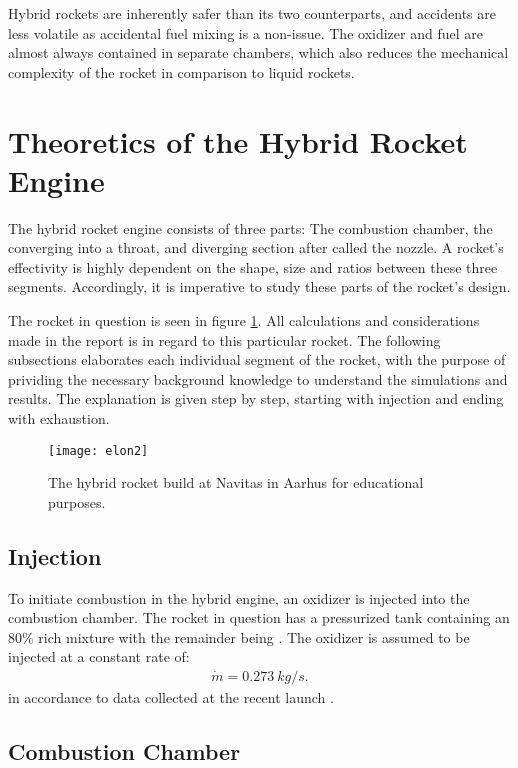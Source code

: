   Hybrid rockets are inherently safer than its two counterparts, and accidents are less volatile as accidental fuel mixing is a non-issue. The oxidizer and fuel are almost always contained in separate chambers, which also reduces the mechanical complexity of the rocket in comparison to liquid rockets.

\section{Theoretics of the Hybrid Rocket Engine}

  The hybrid rocket engine consists of three parts: The combustion chamber, the converging into a throat, and diverging section after called the nozzle. A rocket's effectivity is highly dependent on the shape, size and ratios between these three segments. Accordingly, it is imperative to study these parts of the rocket's design.
  
  The rocket in question is seen in figure \ref{fig:rocketpic}. All calculations and considerations made in the report is in regard to this particular rocket. The following subsections elaborates each individual segment of the rocket, with the purpose of prividing the necessary background knowledge to understand the simulations and results. The explanation is given step by step, starting with injection and ending with exhaustion. 

  \begin{figure}
  \texttt{[image: elon2]}
  \caption{The hybrid rocket build at Navitas in Aarhus for educational purposes.}
  \label{fig:rocketpic}
  \end{figure}
\subsection{Injection}
	
	To initiate combustion in the hybrid engine, an oxidizer is injected into the combustion chamber. The rocket in question has a pressurized tank containing an $80 \%$  rich mixture with the remainder being . The oxidizer is assumed to be injected at a constant rate of:
		\begin{align}
			\dot{m} = \SI{0.273}{kg/s}.
		\end{align}
	in accordance to data collected at the recent launch .
	
	
\subsection{Combustion Chamber}

